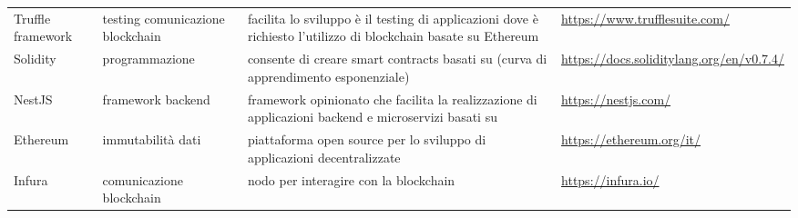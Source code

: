 \begin{longtable}{ C{1.5cm} C{3cm} C{5cm} C{3.5cm} }
    {Truffle framework} & {testing comunicazione blockchain} & {facilita lo sviluppo è il testing di applicazioni dove è richiesto l'utilizzo di blockchain basate su Ethereum} & {\url{https://www.trufflesuite.com/}}\\
    {Solidity} & {programmazione  } & {consente di creare smart contracts basati su (curva di apprendimento esponenziale)} & {\url{https://docs.soliditylang.org/en/v0.7.4/}}\\
    {NestJS} & {framework backend} & {framework opinionato che facilita la realizzazione di applicazioni backend e microservizi basati su } & {\url{https://nestjs.com/}}\\
    {Ethereum} & {immutabilità dati} & {piattaforma open source per lo sviluppo di applicazioni decentralizzate} & {\url{https://ethereum.org/it/}}\\
    {Infura} & {comunicazione blockchain} & {nodo per interagire con la blockchain} & {\url{https://infura.io/}}\\
\end{longtable}

 
